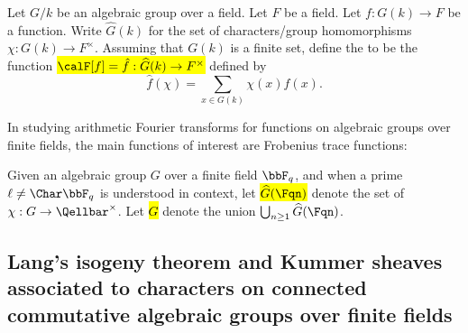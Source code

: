 \begin{definition} \label{definition:fourier_transform_of_a_function_on_a_finite_group_of_rational_points_of_an_algebraic_group_over_a_field}
    Let $G/k$ be an algebraic group over a field. Let $F$ be a field. Let $f: G(k) \to F$ be a function. Write $\widehat{G}(k)$ for the set of characters/group homomorphisms $\chi: G(k) \to F^\times$.
    Assuming that $G(k)$ is a finite set, define the  to be the function \hl{$\calF[f] = \hat{f} :\widehat{G}(k) \to F^\times$} defined by 
    $$\hat{f}(\chi) = \sum_{x \in G(k)} \chi(x) f(x).$$
\end{definition}

In studying arithmetic Fourier transforms for functions on algebraic groups over finite fields, the main functions of interest are Frobenius trace functions:






\begin{notation} \label{notation:characters_of_the_points_of_an_algebraic_group_over_a_finite_field}
    Given an algebraic group $G$ over a finite field $\bbF_q$, and when a prime $\ell \neq \Char \bbF_q$ is understood in context, let \hl{$\widehat{G}(\Fqn)$} denote the set of  $\chi: G \to \Qellbar^\times$. Let \hl{$\widehat{G}$} denote the union
    $\bigcup_{n\geq 1} \widehat{G}(\Fqn)$.
\end{notation}



\subsection{Lang's isogeny theorem and Kummer sheaves associated to characters on connected commutative algebraic groups over finite fields}



